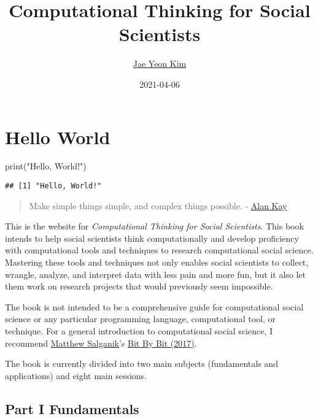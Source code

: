 \documentclass[
]{book}
\title{Computational Thinking for Social Scientists}
\author{\href{https://jaeyk.github.io/}{Jae Yeon Kim}}
\date{2021-04-06}
\newenvironment{Shaded}{\begin{snugshade}}{\end{snugshade}}
\newcommand{\FunctionTok}[1]{\textcolor[rgb]{0.00,0.00,0.00}{#1}}
\newcommand{\NormalTok}[1]{#1}
\newcommand{\StringTok}[1]{\textcolor[rgb]{0.31,0.60,0.02}{#1}}
\begin{document}
\maketitle

{
\hypersetup{linkcolor=}
\setcounter{tocdepth}{1}
\tableofcontents
}
\hypertarget{hello-world}{%
\chapter{Hello World}\label{hello-world}}

\begin{Shaded}
\begin{Highlighting}[]
\FunctionTok{print}\NormalTok{(}\StringTok{"Hello, World!"}\NormalTok{)}
\end{Highlighting}
\end{Shaded}

\begin{verbatim}
## [1] "Hello, World!"
\end{verbatim}

\begin{quote}
Make simple things simple, and complex things possible. - \href{https://www.quora.com/What-is-the-story-behind-Alan-Kay-s-adage-Simple-things-should-be-simple-complex-things-should-be-possible}{Alan Kay}
\end{quote}

This is the website for \emph{Computational Thinking for Social Scientists}. This book intends to help social scientists think computationally and develop proficiency with computational tools and techniques to research computational social science. Mastering these tools and techniques not only enables social scientists to collect, wrangle, analyze, and interpret data with less pain and more fun, but it also let them work on research projects that would previously seem impossible.

The book is not intended to be a comprehensive guide for computational social science or any particular programming language, computational tool, or technique. For a general introduction to computational social science, I recommend \href{http://www.princeton.edu/~mjs3/}{Matthew Salganik}'s \href{https://www.bitbybitbook.com/}{Bit By Bit (2017)}.

The book is currently divided into two main subjects (fundamentals and applications) and eight main sessions.

\hypertarget{part-i-fundamentals}{%
\section{Part I Fundamentals}\label{part-i-fundamentals}}
\end{document}

